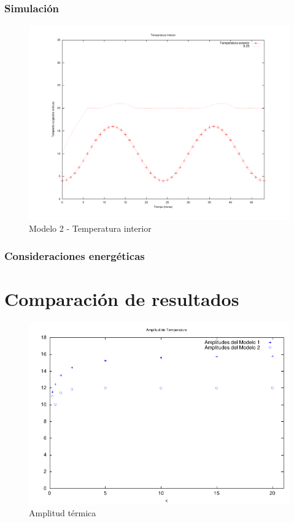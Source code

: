 \documentclass{sig-alternate}
\begin{document}
\subsubsection{Simulaci\'{o}n}


\begin{figure}[hp]
\label{segundo_modelo_k_un_cuarto}
\centering
\includegraphics[scale=0.8]{graficos/modelo2}
\caption{Modelo 2 - Temperatura interior}
\end{figure}

\subsubsection{Consideraciones energ\'{e}ticas}


\section{Comparaci\'{o}n de resultados}\label{resultados}

\begin{figure}[hp]
\label{amplitud_termica}
\centering
\includegraphics[scale=1.05]{graficos/amplitudes}
\caption{Amplitud t\'{e}rmica}
\end{figure}
\end{document}
